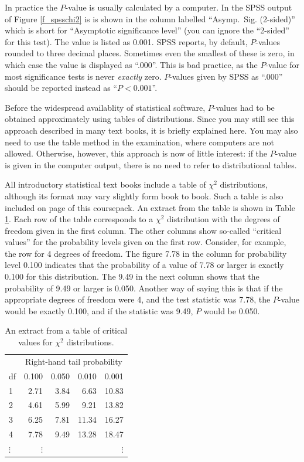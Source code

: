 \label{p_spss2b}
In practice the $P$-value is usually calculated by a computer. In the
SPSS output of Figure \ref{f_spsschi2} is is shown
in the column labelled ``Asymp.\ Sig. (2-sided)''
which is short for ``Asymptotic significance level'' (you can ignore the
``2-sided'' for this test). The value is listed as 0.001. SPSS reports,
by default, $P$-values rounded to three decimal places. Sometimes even
the smallest of these is zero, in which case the value is displayed
as ``.000''. This is bad practice, as the $P$-value for most
significance tests is never \emph{exactly} zero. $P$-values given by
SPSS as ``.000'' should be reported instead as ``$P<0.001$''.

Before the widespread availablity of statistical software, $P$-values
had to be obtained approximately using tables of distributions. Since
you may still see this approach described in many text books, it is
briefly explained here. You may also need to use the table method in the
examination, where computers are not allowed. Otherwise, however, this
approach is now of little interest: if the $P$-value is given in the
computer output, there is no need to refer to distributional tables.

All introductory statistical text books include a table of
$\chi^{2}$ distributions, although its format may vary
slightly form book to book. Such a table is also included on page
\pageref{s_disttables_chi2} of this coursepack. An extract from the
table is shown in Table \ref{t_chi2table}. Each row of the table
corresponds to a $\chi^{2}$ distribution with the degrees of freedom
given in the first column. The other columns show so-called ``critical
values'' for the probability levels given on the first row. Consider,
for example, the row for 4 degrees of freedom. The figure 7.78 in the
column for probability level 0.100 indicates that the probability of a
value of 7.78 or larger is exactly 0.100 for this distribution. The 9.49
in the next column shows that the probability of 9.49 or larger is
0.050. Another way of saying this is that if the appropriate degrees of
freedom were 4, and the test statistic was 7.78, the $P$-value would be
exactly 0.100, and if the statistic was 9.49, $P$ would be 0.050.

\begin{table}[t]
\caption{An extract from a table of critical values for
$\chi^{2}$ distributions.}
\label{t_chi2table}
\begin{center}
\begin{tabular}{|l|rrrr|}\hline
& \multicolumn{4}{|c|}{Right-hand tail probability} \\
df & 0.100 & 0.050 & 0.010 & 0.001 \\ \hline
1 & 2.71 & 3.84 & 6.63 & 10.83 \\
2 & 4.61 & 5.99 & 9.21 & 13.82 \\
3 & 6.25 & 7.81 & 11.34 & 16.27 \\
4 & 7.78 & 9.49 & 13.28 & 18.47 \\
$\vdots$ & $\vdots$ & &  & $\vdots$ \\
\hline
\end{tabular}
\end{center}
\end{table}

